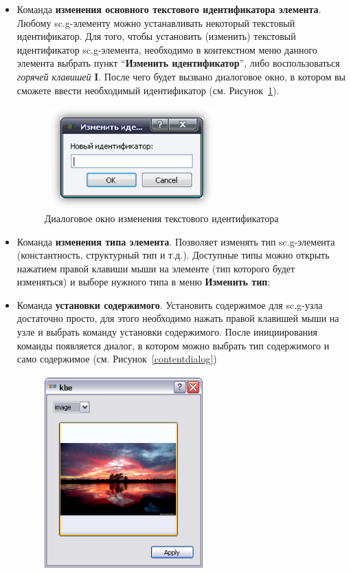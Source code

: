 \begin{itemize}
	\item Команда \textbf{изменения основного текстового идентификатора элемента}. Любому sc.g-элементу можно устанавливать некоторый текстовый идентификатор. Для того, чтобы установить (изменить) текстовый идентификатор sc.g-элемента, необходимо в контекстном меню данного элемента выбрать пункт “\textbf{Изменить идентификатор}”, либо воспользоваться \textit{горячей клавишей} \textbf{I}. После чего будет вызвано диалоговое окно, в котором вы сможете ввести необходимый идентификатор (см. Рисунок~\ref{idtfdialog}).
	\begin{figure}[h]
		\centering\includegraphics[width=6.70cm, height=3.92cm]{../images/idtfdialog.png}
		\caption{Диалоговое окно изменения текстового идентификатора}
		\label{idtfdialog}
	\end{figure}
	\item Команда \textbf{изменения типа элемента}. Позволяет изменять тип sc.g-элемента (константность, структурный тип и т.д.). Доступные типы можно открыть нажатием правой клавиши мыши на элементе (тип которого будет изменяться) и выборе нужного типа в меню \textbf{Изменить тип};
	\item Команда \textbf{установки содержимого}. Установить содержимое для sc.g-узла достаточно просто, для этого необходимо  нажать правой клавишей мыши на узле и выбрать команду установки содержимого. После инициирования команды появляется диалог, в котором можно выбрать тип содержимого и само содержимое (см. Рисунок~\ref{contentdialog})
	\begin{figure}[h]
		\centering\includegraphics[width=6.09cm, height=7.46cm]{../images/contentdialog.png}

\end{figure}
\end{itemize}
